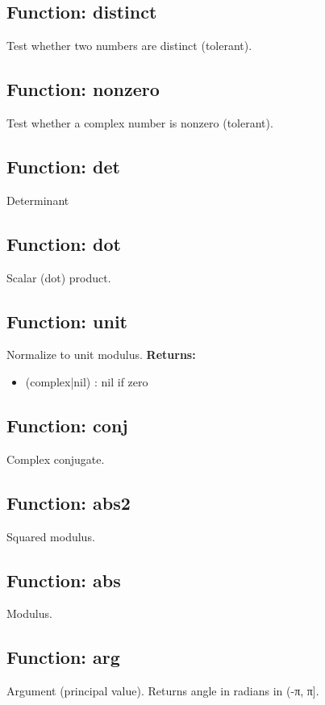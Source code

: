 \documentclass{article}
\begin{document}
\subsection*{Function: distinct}
Test whether two numbers are distinct (tolerant).
\hrulefill

\subsection*{Function: nonzero}
Test whether a complex number is nonzero (tolerant).
\hrulefill

\subsection*{Function: det}
Determinant
\hrulefill

\subsection*{Function: dot}
Scalar (dot) product.
\hrulefill

\subsection*{Function: unit}
Normalize to unit modulus.
\textbf{Returns:}
\begin{itemize}
\item (complex|nil) : nil if zero
\end{itemize}
\hrulefill

\subsection*{Function: conj}
Complex conjugate.
\hrulefill

\subsection*{Function: abs2}
Squared modulus.
\hrulefill

\subsection*{Function: abs}
Modulus.
\hrulefill

\subsection*{Function: arg}
Argument (principal value). Returns angle in radians in (-π, π].
\hrulefill
\end{document}

